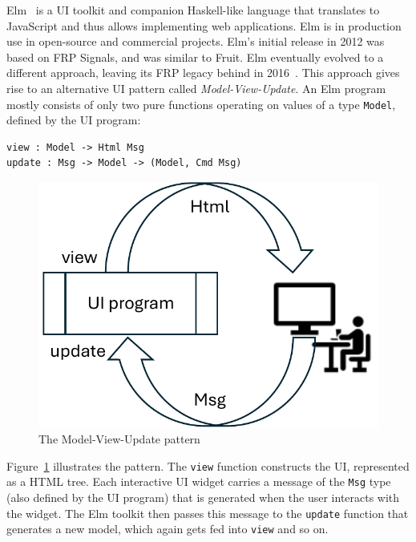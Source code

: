 \documentclass[sigplan,screen]{acmart}
\begin{document}
Elm~\cite{Elm} is a UI toolkit and companion Haskell-like language
that translates to JavaScript and thus allows implementing web
applications.  Elm is in production use in open-source and
commercial projects.  Elm's initial release in 2012 was based on FRP Signals,
and was similar to Fruit.  
Elm eventually evolved to a different approach,
leaving its FRP legacy behind in 2016~\cite{ElmFarewellFRP}.  This approach
gives rise to an alternative UI pattern called
\textit{Model-View-Update}.  An Elm program mostly consists of only
two pure functions operating on values of a type \texttt{Model},
defined by the UI program:
%
\begin{verbatim}
view : Model -> Html Msg
update : Msg -> Model -> (Model, Cmd Msg)
\end{verbatim}
%
\begin{figure}
  \centering
  \includegraphics[width=0.6\columnwidth]{model-view-update}
  \caption{The Model-View-Update pattern}
  \label{fig:mvu}
\end{figure}
%
Figure~\ref{fig:mvu} illustrates the pattern.
The \texttt{view} function constructs the UI, represented as a HTML
tree.  Each interactive UI widget carries a message of the
\texttt{Msg} type (also defined by the UI program) that is generated
when the user interacts with the widget.  The Elm toolkit then passes
this message to the \texttt{update} function that generates a new
model, which again gets fed into \texttt{view} and so on.
\end{document}
